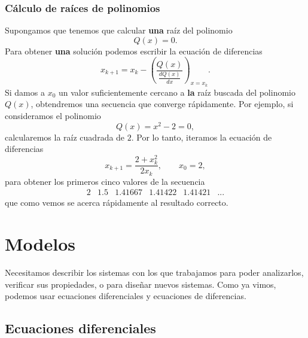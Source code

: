 \documentclass[11pt,a4paper,openany]{book}
\begin{document}
\subsubsection{Cálculo de raíces de polinomios}
Supongamos que tenemos que calcular \textbf{una} raíz del polinomio
\begin{equation}
	Q(x) = 0.
\end{equation}
Para obtener \textbf{una} solución podemos escribir la ecuación de diferencias
\begin{equation}
	x_{k+1} = x_{k} - \left(\frac{Q(x)}{\frac{d Q(x)}{dx}}\right)_{x=x_{k}}.
\end{equation}
Si damos a $x_{0}$ un valor suficientemente cercano a \textbf{la} raíz buscada del polinomio $Q(x)$, obtendremos una secuencia que converge rápidamente. Por ejemplo, si consideramos el polinomio
\begin{equation}
	Q(x) = x^{2} - 2 = 0, 
\end{equation}
calcularemos la raíz cuadrada de $2$. Por lo tanto, iteramos la ecuación de diferencias
\begin{equation}
	x_{k+1} = \frac{2 + x^{2}_{k}}{2 x_{k}}, \qquad x_{0} = 2,
\end{equation}
para obtener los primeros cinco valores de la secuencia
\begin{equation}
	\begin{array}{llllll}
		2 & 1.5 & 1.41667 & 1.41422 & 1.41421 & ...
	\end{array}
\end{equation}
que como vemos se acerca rápidamente al resultado correcto.

\section{Modelos}

Necesitamos describir los sistemas con los que trabajamos para poder analizarlos, verificar sus propiedades, o para diseñar nuevos sistemas. Como ya vimos, podemos usar ecuaciones diferenciales y ecuaciones de diferencias.

\subsection{Ecuaciones diferenciales}
\end{document}

